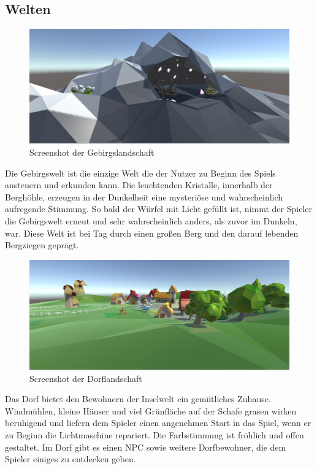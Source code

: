 \subsection{Welten}

\begin{figure}[!htbp]%
	\centering
		\includegraphics[width=1.0\textwidth]{images/Gebirge}
	\caption{Screenshot der Gebirgslandschaft}
	\label{fig:Gebirge}
\end{figure}

Die Gebirgswelt ist die einzige Welt die der Nutzer zu Beginn des Spiels ansteuern und erkunden kann. Die leuchtenden Kristalle, innerhalb der Berghöhle, erzeugen in der Dunkelheit eine mysteriöse und wahrscheinlich aufregende Stimmung. So bald der Würfel mit Licht gefüllt ist, nimmt der Spieler die Gebirgswelt erneut und sehr wahrscheinlich anders, als zuvor im Dunkeln, war. Diese Welt ist bei Tag durch einen großen Berg und den darauf lebenden Bergziegen geprägt.


\begin{figure}[!htbp]%
	\centering
		\includegraphics[width=1.0\textwidth]{images/Dorf}
	\caption{Screenshot der Dorflandschaft}
	\label{fig:Dorf}
\end{figure}

Das Dorf bietet den Bewohnern der Inselwelt ein gemütliches Zuhause. Windmühlen, kleine Häuser und viel Grünfläche auf der Schafe grasen wirken beruhigend und liefern dem Spieler einen angenehmen Start in das Spiel, wenn er zu Beginn die Lichtmaschine repariert. Die Farbstimmung ist fröhlich und offen gestaltet. Im Dorf gibt es einen NPC sowie weitere Dorfbewohner, die dem Spieler einiges zu entdecken geben.

